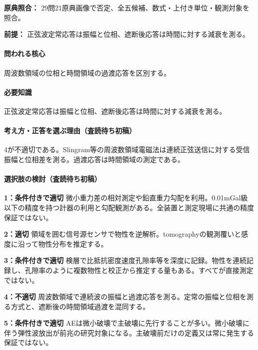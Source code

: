 \noindent\textbf{原典照合：} 29問21原典画像で否定、全五候補、数式・上付き単位・観測対象を照合。\par

\noindent\textbf{前提：} 正弦波定常応答は振幅と位相、遮断後応答は時間に対する減衰を測る。\par

\paragraph{問われる核心} 周波数領域の位相と時間領域の過渡応答を区別する。

\paragraph{必要知識} 正弦波定常応答は振幅と位相、遮断後応答は時間に対する減衰を測る。

\paragraph{考え方・正答を選ぶ理由（査読待ち初稿）} 4が不適切である。Slingram等の周波数領域電磁法は連続正弦送信に対する受信振幅と位相差を測る。過渡応答は時間領域の測定である。

\paragraph{選択肢の検討（査読待ち初稿）}\mbox{}\par

\noindent\textbf{1：条件付きで適切} 微小重力差の相対測定や鉛直重力勾配を利用。0.01mGal級以下の精度を持つ計器の利用と勾配観測がある。全装置と測定現場に共通の精度保証ではない。\par

\noindent\textbf{2：適切} 領域を囲む信号源センサで物性を逆解析。tomographyの観測覆いと感度に沿って物性分布を推定する。\par

\noindent\textbf{3：条件付きで適切} 検層で比抵抗密度速度孔隙率等を深度に記録。物性を連続記録し、孔隙率のように複数物性と校正から推定する量もある。すべてが直接測定ではない。\par

\noindent\textbf{4：不適切} 周波数領域で連続波の振幅と過渡応答を測る。定常の振幅と位相を測る方式と、遮断後の時間領域過渡を混同する。\par

\noindent\textbf{5：条件付きで適切} AEは微小破壊で主破壊に先行することが多い。微小破壊に伴う弾性波放出が前兆の研究対象になる。主破壊前だけの定義又は常に発生する保証ではない。\par

